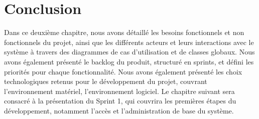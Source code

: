 \section*{Conclusion}
Dans ce deuxième chapitre, nous avons détaillé les besoins fonctionnels et non fonctionnels du projet, ainsi que les différents acteurs et leurs interactions avec le système à travers des diagrammes de cas d'utilisation et de classes globaux. Nous avons également présenté le backlog du produit, structuré en sprints, et défini les priorités pour chaque fonctionnalité.
Nous avons également présenté les choix technologiques retenus pour le développement du projet, couvrant l'environnement matériel, l'environnement logiciel.
Le chapitre suivant sera consacré à la présentation du Sprint 1, qui couvrira les premières étapes du développement, notamment l'accès et l'administration de base du système.



